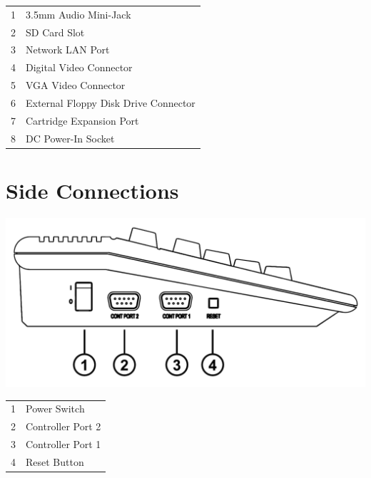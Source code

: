 \begin{center}
\begin{longtable}{ c | l}

	1	& 	3.5mm Audio Mini-Jack \\
	2	& 	SD Card Slot\\
	3	& 	Network LAN Port \\
	4	& 	Digital Video Connector \\
	5	& 	VGA Video Connector \\
	6	& 	External Floppy Disk Drive Connector \\
	7	& 	Cartridge Expansion Port \\
	8	& 	DC Power-In Socket \\

\end{longtable}
\end{center}

\newpage

\section{Side Connections}

\includegraphics[width=\linewidth]{images/illustrations/mega65-side.pdf}

\begin{center}
\begin{longtable}{ c | l}

	1	& 	Power Switch \\
	2	& 	Controller Port 2 \\
	3	& 	Controller Port 1 \\
	4	& 	Reset Button \\

\end{longtable}
\end{center}

